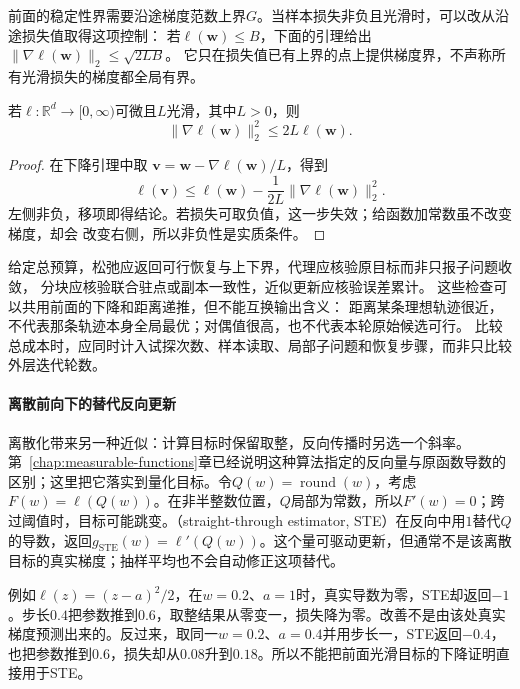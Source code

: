 前面的稳定性界需要沿途梯度范数上界$G$。当样本损失非负且光滑时，可以改从沿途损失值取得这项控制：
若$\ell(\bm w)\leq B$，下面的引理给出$\|\nabla\ell(\bm w)\|_2\leq\sqrt{2LB}$。
它只在损失值已有上界的点上提供梯度界，不声称所有光滑损失的梯度都全局有界。

\begin{lemma}[非负光滑函数的梯度自界]
\label{lem:opt-self-bounding}
若$\ell:\mathbb{R}^d\to[0,\infty)$可微且$L$光滑，其中$L>0$，则
\[
  \lVert\nabla\ell(\bm{w})\rVert_2^2\leq2L\ell(\bm{w}).
\]
\end{lemma}

\begin{proof}
在下降引理中取
$\bm{v}=\bm{w}-\nabla\ell(\bm{w})/L$，得到
\[
  \ell(\bm{v})
  \leq\ell(\bm{w})-\frac{1}{2L}
  \lVert\nabla\ell(\bm{w})\rVert_2^2.
\]
左侧非负，移项即得结论。若损失可取负值，这一步失效；给函数加常数虽不改变梯度，却会
改变右侧，所以非负性是实质条件。
\end{proof}

给定总预算，松弛应返回可行恢复与上下界，代理应核验原目标而非只报子问题收敛，
分块应核验联合驻点或副本一致性，近似更新应核验误差累计。
这些检查可以共用前面的下降和距离递推，但不能互换输出含义：
距离某条理想轨迹很近，不代表那条轨迹本身全局最优；对偶值很高，也不代表本轮原始候选可行。
比较总成本时，应同时计入试探次数、样本读取、局部子问题和恢复步骤，而非只比较外层迭代轮数。

\paragraph{离散前向下的替代反向更新}
\label{sec:opt-straight-through}

离散化带来另一种近似：计算目标时保留取整，反向传播时另选一个斜率。第~\ref{chap:measurable-functions}章已经说明这种算法指定的反向量与原函数导数的区别；这里把它落实到量化目标。令$Q(w)=\operatorname{round}(w)$，考虑$F(w)=\ell(Q(w))$。在非半整数位置，$Q$局部为常数，所以$F'(w)=0$；跨过阈值时，目标可能跳变。（straight-through estimator, STE）在反向中用$1$替代$Q$的导数，返回$g_{\mathrm{STE}}(w)=\ell'(Q(w))$。这个量可驱动更新，但通常不是该离散目标的真实梯度；抽样平均也不会自动修正这项替代。

例如$\ell(z)=(z-a)^2/2$，在$w=0.2$、$a=1$时，真实导数为零，STE却返回$-1$。步长$0.4$把参数推到$0.6$，取整结果从零变一，损失降为零。改善不是由该处真实梯度预测出来的。反过来，取同一$w=0.2$、$a=0.4$并用步长一，STE返回$-0.4$，也把参数推到$0.6$，损失却从$0.08$升到$0.18$。所以不能把前面光滑目标的下降证明直接用于STE。


